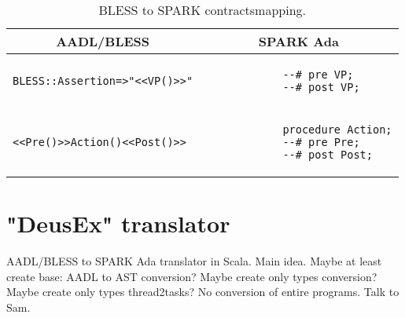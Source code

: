 \begin{table}[!ht]
	\caption{BLESS to SPARK contractsmapping.}
	\centering
  	\begin{tabular}{ | p{3in} | p{3in} |}

		\hline
		\multicolumn{1}{|c|}{\textbf{AADL/BLESS}} & \multicolumn{1}{|c|}{\textbf{SPARK Ada}} \\ \hline

		\begin{lstlisting}[language=bless]
			BLESS::Assertion=>"<<VP()>>"
		\end{lstlisting} 
		& 
		\begin{lstlisting}
			--# pre VP;
			--# post VP; 
		\end{lstlisting} 

		\\ \hline

		\begin{lstlisting}[language=bless]
			<<Pre()>>Action()<<Post()>>
		\end{lstlisting} 
		& 
		\begin{lstlisting}
			procedure Action;
			--# pre Pre;
			--# post Post;
		\end{lstlisting} 

		\\ \hline
	\end{tabular}
\end{table}



\section{"DeusEx" translator}
\label{codegen:translator}
AADL/BLESS to SPARK Ada translator in Scala. Main idea.
Maybe at least create base: AADL to AST conversion?
Maybe create only types conversion?
Maybe create only types thread2tasks?
No conversion of entire programs.
Talk to Sam.

